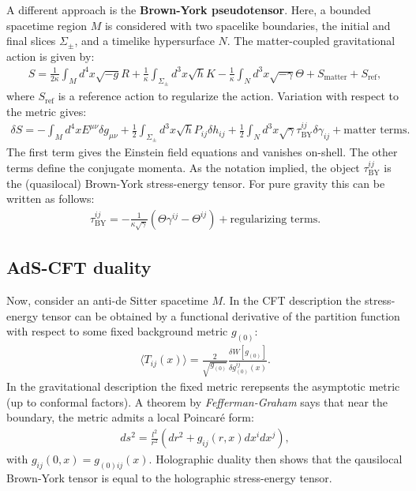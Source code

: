     A different approach is the \textbf{Brown-York pseudotensor}. Here, a bounded spacetime region $M$ is considered with two spacelike boundaries, the initial and final slices $\Sigma_\pm$, and a timelike hypersurface $N$. The matter-coupled gravitational action is given by:
    \begin{gather}
        S = \frac{1}{2\kappa}\int_Md^4x\sqrt{-g}R + \frac{1}{\kappa}\int_{\Sigma_\pm}d^3x\sqrt{h}K - \frac{1}{\kappa}\int_Nd^3x\sqrt{-\gamma}\Theta + S_\mathrm{matter} + S_\mathrm{ref},
    \end{gather}
    where $S_\mathrm{ref}$ is a reference action to regularize the action. Variation with respect to the metric gives:
    \begin{gather}
        \delta S = -\int_Md^4xE^{\mu\nu}\delta g_{\mu\nu} + \frac{1}{2}\int_{\Sigma_\pm}d^3x\sqrt{h}P_{ij}\delta h_{ij} + \frac{1}{2}\int_Nd^3x\sqrt{\gamma}\tau^{ij}_\mathrm{BY}\delta\gamma_{ij} +\text{matter terms}.
    \end{gather}
    The first term gives the Einstein field equations and vanishes on-shell. The other terms define the conjugate momenta. As the notation implied, the object $\tau^{ij}_\mathrm{BY}$ is the (quasilocal) Brown-York stress-energy tensor. For pure gravity this can be written as follows:
    \begin{gather}
        \tau^{ij}_\mathrm{BY} = -\frac{1}{\kappa\sqrt{\gamma}}(\Theta\gamma^{ij}-\Theta^{ij}) +\text{regularizing terms}.
    \end{gather}

\subsection{AdS-CFT duality}

    Now, consider an anti-de Sitter spacetime $M$. In the CFT description the stress-energy tensor can be obtained by a functional derivative of the partition function with respect to some fixed background metric $g_{(0)}$:
    \begin{gather}
        \langle T_{ij}(x) \rangle = \frac{2}{\sqrt{g_{(0)}}}\frac{\delta W[g_{(0)}]}{\delta g^{ij}_{(0)}(x)}.
    \end{gather}
    In the gravitational description the fixed metric rerepsents the asymptotic metric (up to conformal factors). A theorem by \textit{Fefferman-Graham} says that near the boundary, the metric admits a local Poincar\'e form:
    \begin{gather}
        ds^2 = \frac{l^2}{r^2}(dr^2 + g_{ij}(r,x)dx^idx^j),
    \end{gather}
    with $g_{ij}(0,x) = g_{(0)ij}(x)$. Holographic duality then shows that the qausilocal Brown-York tensor is equal to the holographic stress-energy tensor.

